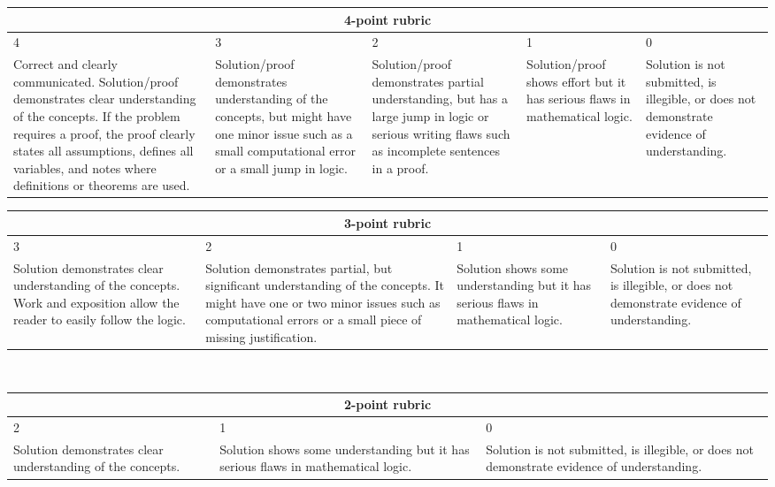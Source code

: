 \documentclass[11pt,addpoints,letterpaper]{exam}
\begin{document}
\begin{center}
\begin{tabular}{|p{3.5cm}|p{2.7cm}|p{2.7cm}|p{2.5cm}|p{2.8cm}|}
\hline \multicolumn{5}{|c|}{4-point rubric}\\ \hline
4 & 3 & 2 &1 & 0\\ \hline
Correct and clearly communicated. Solution/proof demonstrates clear understanding of the concepts. If the problem requires a proof, the proof clearly states all assumptions, defines all variables, and notes where definitions or theorems are used. & Solution/proof demonstrates understanding of the concepts, but might have one minor issue such as a small computational error or a small jump in logic.  & Solution/proof demonstrates partial understanding, but has a large jump in logic or serious writing flaws such as incomplete sentences in a proof.  & Solution/proof shows effort but it has serious flaws in mathematical logic.  &Solution is not submitted, is illegible, or does not demonstrate evidence of understanding. \\ \hline
\end{tabular}
\begin{tabular}{|p{3cm}|p{3.9cm}|p{3cm}|p{2.8cm}|}
\hline \multicolumn{4}{|c|}{3-point rubric}\\ \hline
 3 & 2 &1 & 0\\ \hline
Solution demonstrates clear understanding of the concepts. Work and exposition allow the reader to easily follow the logic. & Solution demonstrates partial, but significant understanding of the concepts. It might have one or two minor issues such as computational errors or a small piece of missing justification. & Solution shows some understanding but it has serious flaws in mathematical logic.  &Solution is not submitted, is illegible, or does not demonstrate evidence of understanding. \\ \hline
\end{tabular}\\
\begin{tabular}{|p{3cm}|p{3.6cm}|p{3.4cm}|}
\hline \multicolumn{3}{|c|}{2-point rubric}\\ \hline
 2 &1 & 0\\ \hline
Solution demonstrates clear understanding of the concepts.  & Solution shows some understanding but it has serious flaws in mathematical logic.  &Solution is not submitted, is illegible, or does not demonstrate evidence of understanding. \\ \hline
\end{tabular}
\end{center}
\end{document}
